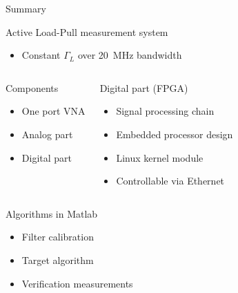 \documentclass{beamer}
\begin{document}
\begin{frame}[t]{Summary}
    \begin{exampleblock}{Active Load-Pull measurement system}
        \begin{itemize}
            \item Constant $\Gamma_L$ over \SI{20}{\mega\hertz} bandwidth
        \end{itemize}
    \end{exampleblock}
    \begin{columns}
            \begin{block}{Components}
                \begin{itemize}
                    \item One port VNA
                    \item Analog part
                    \item Digital part
                \end{itemize}
            \end{block}
            \begin{block}{Digital part (FPGA)}
                \begin{itemize}
                    \item Signal processing chain
                    \item Embedded processor design
                    \item Linux kernel module
                    \item Controllable via Ethernet
                \end{itemize}
            \end{block}
    \end{columns}

    \begin{columns}
            \begin{block}{Algorithms in Matlab}
                \begin{itemize}
                    \item Filter calibration
                    \item Target algorithm
                    \item Verification measurements
                \end{itemize}
            \end{block}
    \end{columns}


\end{frame}
\end{document}
